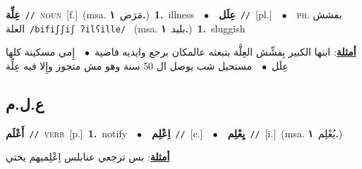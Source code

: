 \documentclass[10pt,a4paper,twoside]{article} %
\begin{document}
\begin{multicols}{2}
{\setlength\topsep{0pt}\textbf{\foreignlanguage{arabic}{عِلِّة}}\ {\color{gray}\texttt{//}\color{black}}\ \textsc{noun}\ [f.]\ \color{gray}(msa. \foreignlanguage{arabic}{مَرَض}~\foreignlanguage{arabic}{\textbf{١.}})\color{black}\ \textbf{1.}~illness\ \ $\bullet$\ \ \setlength\topsep{0pt}\textbf{\foreignlanguage{arabic}{عِلَل}}\ {\color{gray}\texttt{//}\color{black}}\ [pl.]\ \ $\bullet$\ \ \textsc{ph.} \color{gray} \foreignlanguage{arabic}{بفشش العلة}\color{black}\ {\color{gray}\texttt{/{\sffamily bifiʃʃiʃ ʔilʕille}/}\color{black}}\ \color{gray} (msa. \foreignlanguage{arabic}{بليد}~\foreignlanguage{arabic}{\textbf{١.}})\color{black}\ \textbf{1.}~sluggish\  \begin{flushright}\color{gray}\foreignlanguage{arabic}{\textbf{\underline{\foreignlanguage{arabic}{أمثلة}}}: ابنها الكبير بِفشِّش العِلَّة  بتبعثه عالمكان برجع وايديه فاضية\ $\bullet$\ \  إِمي مسكينة كلها عِلَل\ $\bullet$\ \  مستحيل شب يوصل ال 50 سنة وهو مش متجوز وإِلا فيه عِلِّة}\end{flushright}\color{black}} \vspace{2mm}

\vspace{-3mm}
\subsection*{\color{blue}\foreignlanguage{arabic}{ع.ل.م}\color{blue}{}} 

{\setlength\topsep{0pt}\textbf{\foreignlanguage{arabic}{أَعْلَم}}\ {\color{gray}\texttt{//}\color{black}}\ \textsc{verb}\ [p.]\ \textbf{1.}~notify\ \ $\bullet$\ \ \setlength\topsep{0pt}\textbf{\foreignlanguage{arabic}{اِعْلِم}}\ {\color{gray}\texttt{//}\color{black}}\ [c.]\ \ $\bullet$\ \ \setlength\topsep{0pt}\textbf{\foreignlanguage{arabic}{يِعْلِم}}\ {\color{gray}\texttt{//}\color{black}}\ [i.]\ \color{gray}(msa. \foreignlanguage{arabic}{يُعْلِم}~\foreignlanguage{arabic}{\textbf{١.}})\color{black}\  \begin{flushright}\color{gray}\foreignlanguage{arabic}{\textbf{\underline{\foreignlanguage{arabic}{أمثلة}}}: بس ترجعي عنابلس اِعْلِميهم يختي}\end{flushright}\color{black}} \vspace{2mm}


\end{multicols}
\end{document}
